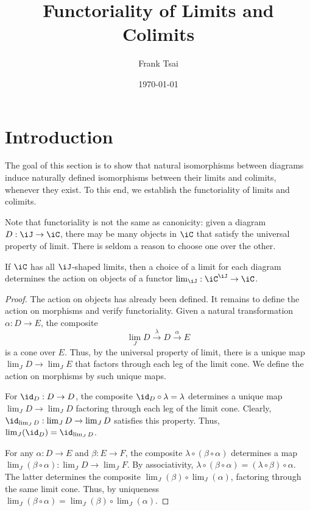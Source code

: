 \documentclass{amsart}
\title{Functoriality of Limits and Colimits}
\author{Frank Tsai}
\date{\today}
\begin{document}
\maketitle
\tableofcontents

\section{Introduction}
\label{sec:introduction}
The goal of this section is to show that natural isomorphisms between diagrams induce naturally defined isomorphisms between their limits and colimits, whenever they exist.
To this end, we establish the functoriality of limits and colimits.

Note that functoriality is not the same as canonicity: given a diagram $D : \iJ \to \iC$, there may be many objects in $\iC$ that satisfy the universal property of limit.
There is seldom a reason to choose one over the other.

\begin{thm}
  If $\iC$ has all $\iJ$-shaped limits, then a choice of a limit for each diagram determines the action on objects of a functor $\lim_{\iJ} : \iC^{\iJ} \to \iC$.
\end{thm}
\begin{proof}
  The action on objects has already been defined.
  It remains to define the action on morphisms and verify functoriality.
  Given a natural transformation $\alpha : D \to E$, the composite
  \[
    \lim_{J}D \overset{\lambda}{\to} D \overset{\alpha}{\to} E
  \]
  is a cone over $E$.
  Thus, by the universal property of limit, there is a unique map $\lim_{J}D \to \lim_{J}E$ that factors through each leg of the limit cone.
  We define the action on morphisms by such unique maps.

  For $\id_{D} : D \to D$, the composite $\id_{D} \circ \lambda = \lambda$ determines a unique map $\lim_{J}D \to \lim_{J}D$ factoring through each leg of the limit cone.
  Clearly, $\id_{\lim_{J}D}: \lim_{J}D \to \lim_{J}D$ satisfies this property.
  Thus, $\lim_{J}(\id_{D}) = \id_{\lim_{J}D}$.

  For any $\alpha : D \to E$ and $\beta : E \to F$, the composite $\lambda \circ (\beta \circ \alpha)$ determines a map $\lim_{J}(\beta \circ \alpha) : \lim_{J}D \to \lim_{J}F$.
  By associativity, $\lambda \circ (\beta \circ \alpha) = (\lambda \circ \beta) \circ \alpha$.
  The latter determines the composite $\lim_{J}(\beta) \circ \lim_{J}(\alpha)$, factoring through the same limit cone.
  Thus, by uniqueness $\lim_{J}(\beta \circ \alpha) = \lim_{J}(\beta) \circ \lim_{J}(\alpha)$.
\end{proof}
\end{document}
